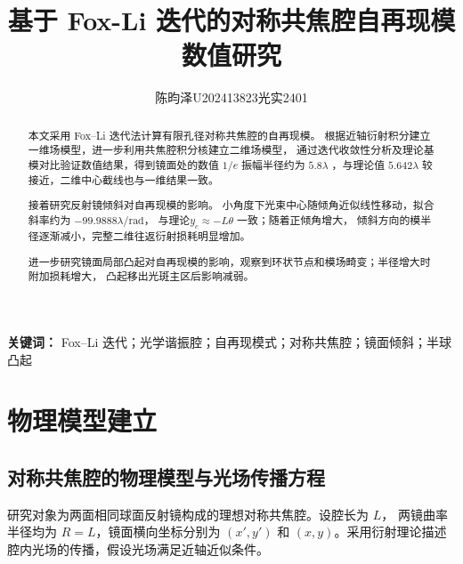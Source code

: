 \documentclass[UTF8,a4paper,12pt]{ctexart}
\title{基于 Fox-Li 迭代的对称共焦腔自再现模数值研究}
\author{陈昀泽\quad U202413823\quad 光实2401}
\date{}
\begin{document}
\maketitle

\begin{abstract}
本文采用 Fox--Li 迭代法计算有限孔径对称共焦腔的自再现模。
根据近轴衍射积分建立一维场模型，进一步利用共焦腔积分核建立二维场模型，
通过迭代收敛性分析及理论基模对比验证数值结果，得到镜面处的数值 \(1/e\) 振幅半径约为 \(5.8\lambda\)
，与理论值 \(5.642\lambda\) 较接近，二维中心截线也与一维结果一致。

接着研究反射镜倾斜对自再现模的影响。
小角度下光束中心随倾角近似线性移动，拟合斜率约为 \(-99.9888\lambda/\mathrm{rad}\)，
与理论\(y_c\approx-L\theta\) 一致；随着正倾角增大，
倾斜方向的模半径逐渐减小，完整二维往返衍射损耗明显增加。

进一步研究镜面局部凸起对自再现模的影响，观察到环状节点和模场畸变；半径增大时附加损耗增大，
凸起移出光斑主区后影响减弱。
\end{abstract}

\noindent\textbf{关键词：} Fox--Li 迭代；光学谐振腔；自再现模式；对称共焦腔；镜面倾斜；半球凸起

\newpage
\begingroup\small\tableofcontents\endgroup
\newpage

\section{物理模型建立}

\subsection{对称共焦腔的物理模型与光场传播方程}
研究对象为两面相同球面反射镜构成的理想对称共焦腔。设腔长为 \(L\)，
两镜曲率半径均为 \(R=L\)，镜面横向坐标分别为 \((x',y')\) 和
 \((x,y)\)。采用衍射理论描述腔内光场的传播，假设光场满足近轴近似条件。
\end{document}
